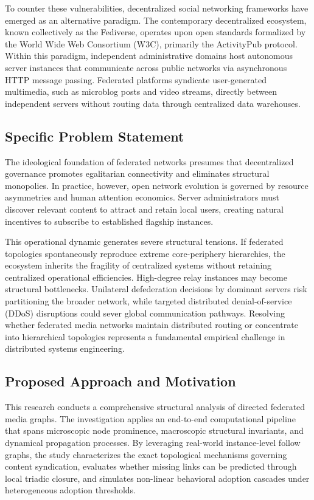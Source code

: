 \documentclass[conference]{IEEEtran}
\begin{document}
To counter these vulnerabilities, decentralized social networking frameworks have emerged as an alternative paradigm. The contemporary decentralized ecosystem, known collectively as the Fediverse, operates upon open standards formalized by the World Wide Web Consortium (W3C), primarily the ActivityPub protocol. Within this paradigm, independent administrative domains host autonomous server instances that communicate across public networks via asynchronous HTTP message passing. Federated platforms syndicate user-generated multimedia, such as microblog posts and video streams, directly between independent servers without routing data through centralized data warehouses.

\subsection{Specific Problem Statement}
The ideological foundation of federated networks presumes that decentralized governance promotes egalitarian connectivity and eliminates structural monopolies. In practice, however, open network evolution is governed by resource asymmetries and human attention economics. Server administrators must discover relevant content to attract and retain local users, creating natural incentives to subscribe to established flagship instances.

This operational dynamic generates severe structural tensions. If federated topologies spontaneously reproduce extreme core-periphery hierarchies, the ecosystem inherits the fragility of centralized systems without retaining centralized operational efficiencies. High-degree relay instances may become structural bottlenecks. Unilateral defederation decisions by dominant servers risk partitioning the broader network, while targeted distributed denial-of-service (DDoS) disruptions could sever global communication pathways. Resolving whether federated media networks maintain distributed routing or concentrate into hierarchical topologies represents a fundamental empirical challenge in distributed systems engineering.

\subsection{Proposed Approach and Motivation}
This research conducts a comprehensive structural analysis of directed federated media graphs. The investigation applies an end-to-end computational pipeline that spans microscopic node prominence, macroscopic structural invariants, and dynamical propagation processes. By leveraging real-world instance-level follow graphs, the study characterizes the exact topological mechanisms governing content syndication, evaluates whether missing links can be predicted through local triadic closure, and simulates non-linear behavioral adoption cascades under heterogeneous adoption thresholds.
\end{document}
